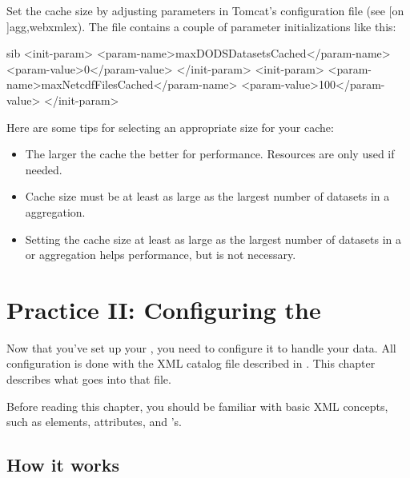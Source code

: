 \documentclass{dods-book}
\begin{document}
Set the cache size by adjusting parameters in Tomcat's
 configuration file (see [on
\pageref{agg,webxmlex}]{agg,webxmlex}).  The file contains a couple of
parameter initializations like this:

\begin{vcode}{sib}
<init-param>
  <param-name>maxDODSDatasetsCached</param-name>
  <param-value>0</param-value>
</init-param>
<init-param>
  <param-name>maxNetcdfFilesCached</param-name>
  <param-value>100</param-value>
</init-param>
\end{vcode}

Here are some tips for selecting an appropriate size for your cache:

\begin{itemize}
  
\item The larger the cache the better for performance. Resources are
  only used if needed.

\item Cache size must be at least as large as the largest number of
  datasets in a  aggregation.
  
\item Setting the cache size at least as large as the largest number
  of datasets in a  or  aggregation helps
  performance, but is not necessary.
\end{itemize}


\chapter{Practice II: Configuring the \AggServer}
\label{aggser,configure}

Now that you've set up your \aggser , you need to
configure it to handle your data.  All configuration is done with the
XML catalog file described in .  This
chapter describes what goes into that file.

Before reading this chapter, you should be familiar with basic XML
concepts, such as elements, attributes, and \dtd 's.  

\section{How it works}
\end{document}
